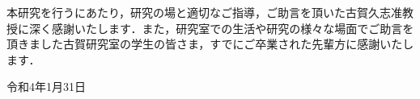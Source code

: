 
\begin{acknowledgements}
    \vspace{1.0cm}
    本研究を行うにあたり，研究の場と適切なご指導，ご助言を頂いた古賀久志准教授に深く感謝いたします．また，研究室での生活や研究の様々な場面でご助言を頂きました古賀研究室の学生の皆さま，すでにご卒業された先輩方に感謝いたします．
    
    \vspace{2.0cm}
    \begin{flushright}
      令和4年1月31日
    \end{flushright}
    
\end{acknowledgements}
